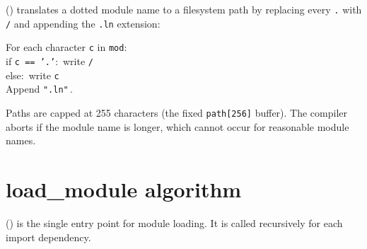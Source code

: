 \pnum
{} ()
translates a dotted module name to a filesystem path by replacing every
\texttt{.} with \texttt{/} and appending the \texttt{.ln} extension:

\begin{algorithm}
For each character \texttt{c} in \texttt{mod}:\\
\quad if \texttt{c == '.'}:\ write \texttt{/}\\
\quad else:\ write \texttt{c}\\
Append \texttt{".ln"}\,.
\end{algorithm}

\pnum
Paths are capped at 255 characters (the fixed \texttt{path[256]} buffer).
The compiler aborts if the module name is longer, which cannot occur for
reasonable module names.

\section{load\_module algorithm}
\label{sec:mod-load}

\pnum
{}
() is the single entry point for module loading.
It is called recursively for each import dependency.

